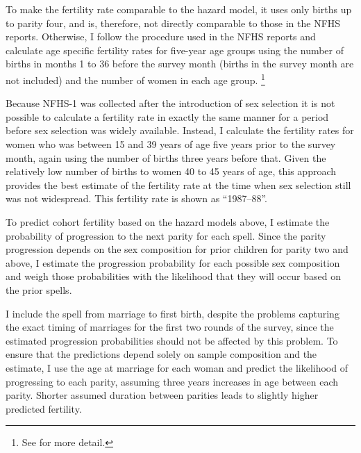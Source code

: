 \documentclass[12pt,letterpaper]{article}
\begin{document}


To make the fertility rate comparable to the hazard model, it uses only births up to 
parity four, and is, therefore, not directly comparable to those in the NFHS reports.
Otherwise, I follow the procedure used in the NFHS reports and calculate age specific 
fertility rates for five-year age groups using the number of births in months 1 to 36 
before the survey month (births in the survey month are not included) and the number
of women in each age group.%
\footnote{
See \citet{Croft2018} for more detail.
}

Because NFHS-1 was collected after the introduction of sex selection it is not possible 
to calculate a fertility rate in exactly the same manner for a period 
before sex selection was widely available.
Instead, I calculate the fertility rates for women who was between 15 and 39 years of
age five years prior to the survey month, again using the number of births three years 
before that.
Given the relatively low number of births to women 40 to 45 years of age, this approach 
provides the best estimate of the fertility rate at the time when sex selection still was 
not widespread.
This fertility rate is shown as ``1987--88''.

To predict cohort fertility based on the hazard models above, I estimate the probability 
of progression to the next parity for each spell.
Since the parity progression depends on the sex composition for prior children for parity 
two and above, I estimate the progression probability for each possible sex composition
and weigh those probabilities with the likelihood that they will occur based on the
prior spells.

I include the spell from marriage to first birth, despite the problems capturing the 
exact timing of marriages for the first two rounds of the survey, since
the estimated progression probabilities should not be affected by this problem.
To ensure that the predictions depend solely on sample composition and the estimate, I
use the age at marriage for each woman and predict the likelihood of progressing to
each parity, assuming three years increases in age between each parity.
Shorter assumed duration between parities leads to slightly higher predicted 
fertility.
\end{document}
